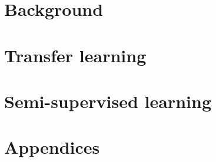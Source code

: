 % 
\pagestyle{empty}



\frontmatter






\mainmatter
\pagestyle{scrheadings}



\part{Background}
\label{part:background}



\part{Transfer learning}
\label{part:transfer}



\part{Semi-supervised learning}
\label{part:segmentation}


% 



\appendix
\part{Appendices}






\backmatter
\listoffigures
\listoftables

\printbibliography





